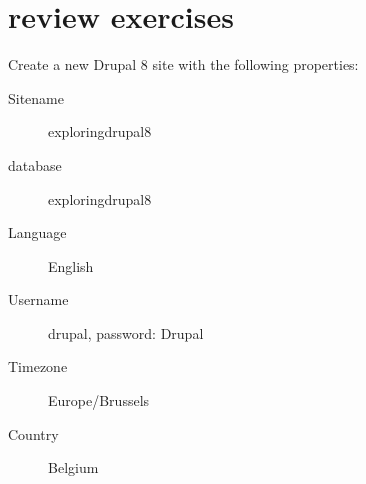   \section{review exercises}
  
  Create a new Drupal 8 site with the following properties:
  
   \begin{description}
   	\item[Sitename] exploringdrupal8
   	\item[database] exploringdrupal8
   	\item[Language] English
   	\item[Username] drupal, password: Drupal
   	\item[Timezone] Europe/Brussels
   	\item[Country] Belgium
   \end{description}
  
	
